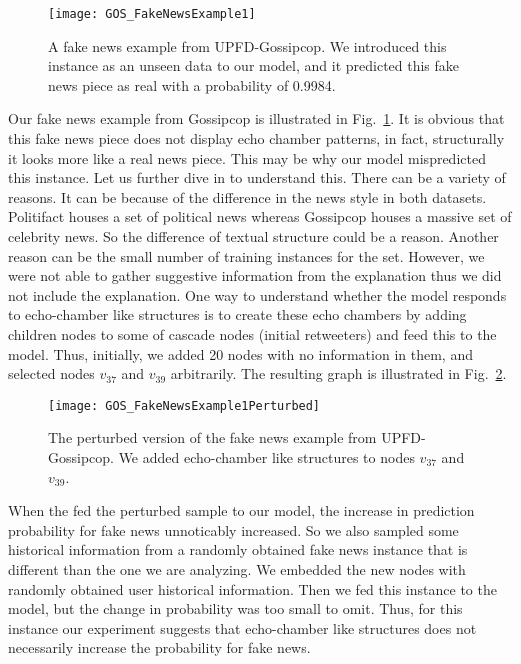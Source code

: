 \begin{figure}
    \centering
    \texttt{[image: GOS\_FakeNewsExample1]}
    \caption[A fake news example from UPFD-Gossipcop.]{A fake news example from UPFD-Gossipcop. We introduced this instance as an unseen data to our model, and it predicted this fake news piece as real with a probability of 0.9984.}
    \label{fig:GOS_FakeNewsExample1}
\end{figure}
Our fake news example from Gossipcop is illustrated in Fig.~\ref{fig:GOS_FakeNewsExample1}. It is obvious that this fake news piece does not display echo chamber patterns, in fact, structurally it looks more like a real news piece. This may be why our model mispredicted this instance. Let us further dive in to understand this. There can be a variety of reasons. It can be because of the difference in the news style in both datasets. Politifact houses a set of political news whereas Gossipcop houses a massive set of celebrity news. So the difference of textual structure could be a reason. Another reason can be the small number of training instances for the set. However, we were not able to gather suggestive information from the explanation thus we did not include the explanation. One way to understand whether the model responds to echo-chamber like structures is to create these echo chambers by adding children nodes to some of cascade nodes (initial retweeters) and feed this to the model. Thus, initially, we added 20 nodes with no information in them, and selected nodes $v_{37}$ and $v_{39}$ arbitrarily. The resulting graph is illustrated in Fig.~\ref{fig:GOS_FakeNewsExample1Perturbed}.
\begin{figure}
    \centering
    \texttt{[image: GOS\_FakeNewsExample1Perturbed]}
    \caption[The perturbed version of the fake news example from UPFD-Gossipcop]{The perturbed version of the fake news example from UPFD-Gossipcop. We added echo-chamber like structures to nodes $v_{37}$ and $v_{39}$.}
    \label{fig:GOS_FakeNewsExample1Perturbed}
\end{figure}
When the fed the perturbed sample to our model, the increase in prediction probability for fake news unnoticably increased. So we also sampled some historical information from a randomly obtained fake news instance that is different than the one we are analyzing. We embedded the new nodes with randomly obtained user historical information. Then we fed this instance to the model, but the change in probability was too small to omit. Thus, for this instance our experiment suggests that echo-chamber like structures does not necessarily increase the probability for fake news.\\
